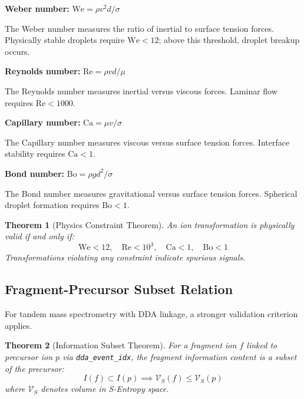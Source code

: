 \documentclass[twocolumn,10pt]{article}
\newtheorem{theorem}{Theorem}[section]
\begin{document}
\textbf{Weber number:} $\mathrm{We} = \rho v^2 d / \sigma$

The Weber number measures the ratio of inertial to surface tension forces. Physically stable droplets require $\mathrm{We} < 12$; above this threshold, droplet breakup occurs.

\textbf{Reynolds number:} $\mathrm{Re} = \rho v d / \mu$

The Reynolds number measures inertial versus viscous forces. Laminar flow requires $\mathrm{Re} < 1000$.

\textbf{Capillary number:} $\mathrm{Ca} = \mu v / \sigma$

The Capillary number measures viscous versus surface tension forces. Interface stability requires $\mathrm{Ca} < 1$.

\textbf{Bond number:} $\mathrm{Bo} = \rho g d^2 / \sigma$

The Bond number measures gravitational versus surface tension forces. Spherical droplet formation requires $\mathrm{Bo} < 1$.

\begin{theorem}[Physics Constraint Theorem]
An ion transformation is physically valid if and only if:
\begin{equation}
    \mathrm{We} < 12, \quad \mathrm{Re} < 10^3, \quad \mathrm{Ca} < 1, \quad \mathrm{Bo} < 1
\end{equation}
Transformations violating any constraint indicate spurious signals.
\end{theorem}

\subsection{Fragment-Precursor Subset Relation}

For tandem mass spectrometry with DDA linkage, a stronger validation criterion applies.

\begin{theorem}[Information Subset Theorem]
For a fragment ion $f$ linked to precursor ion $p$ via \texttt{dda\_event\_idx}, the fragment information content is a subset of the precursor:
\begin{equation}
    I(f) \subset I(p) \implies \mathcal{V}_S(f) \leq \mathcal{V}_S(p)
\end{equation}
where $\mathcal{V}_S$ denotes volume in S-Entropy space.
\end{theorem}
\end{document}
